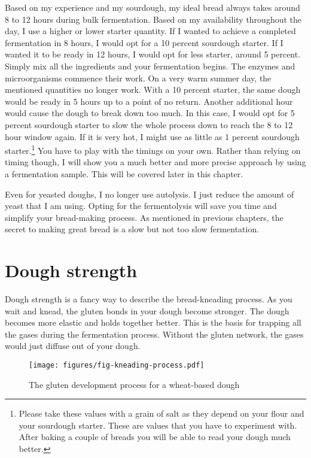 Based on my experience and my sourdough, my ideal bread always takes around 8
to 12 hours during bulk fermentation. Based on my availability throughout
the day, I use a higher or lower starter quantity. If I wanted to achieve a completed
fermentation in 8 hours, I would opt for a 10 percent sourdough starter. If I
wanted it to be ready in 12 hours, I would opt for less starter, around 5 percent.
Simply mix all the ingredients and your fermentation begins. The
enzymes and microorganisms commence their work. On a very warm summer day, the
mentioned quantities no longer work. With a 10 percent starter, the same dough
would be ready in 5 hours up to a point of no return. Another additional hour
would cause the dough to break down too much. In this case, I would opt for 5
percent sourdough starter to slow the whole process down to reach the 8 to 12
hour window again. If it is very hot, I might use as little as 1 percent
sourdough starter.\footnote{Please take these values with a grain of salt as
they depend on your flour and your sourdough starter. These are values that
you have to experiment with. After baking a couple of breads you will be able
to read your dough much better.} You have to play with the timings on your own.
Rather than relying on timing though, I will show you a much better and more precise approach
by using a fermentation sample. This will be covered later in this chapter.

Even for yeasted doughs, I no longer use autolysis. I just reduce the amount
of yeast that I am using. Opting for the fermentolysis will
save you time and simplify your bread-making process. As mentioned in previous chapters,
the secret to making great bread is a slow but not too slow fermentation.

\section{Dough strength}

Dough strength is a fancy way to describe the bread-kneading process. As you wait and
knead, the gluten bonds in your dough become stronger. The dough
becomes more elastic and holds together better. This is the basis for trapping
all the gases during the fermentation process. Without the gluten network,
the gases would just diffuse out of your dough.

\begin{figure}[!htb]
  \texttt{[image: figures/fig-kneading-process.pdf]}
  \caption{The gluten development process for a wheat-based dough}
  \label{fig:wheat-sourdough-kneading-process}
\end{figure}

